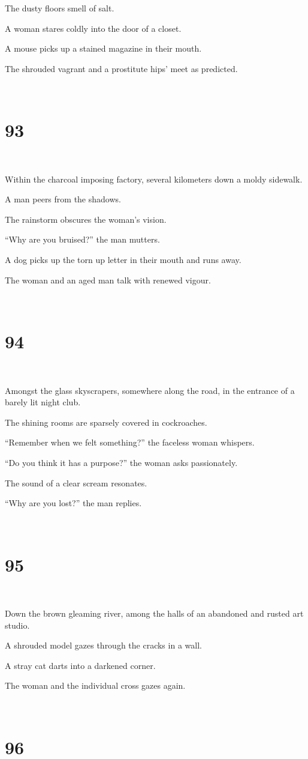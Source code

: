 \documentclass{report}
\begin{document}
The dusty floors smell of salt.

A woman stares coldly into the door of a closet.

A mouse picks up a stained magazine in their mouth.

The shrouded vagrant and a prostitute hips' meet as predicted.

~
\chapter*{93}
~

Within the charcoal imposing factory, several kilometers down a moldy sidewalk.

A man peers from the shadows.

The rainstorm obscures the woman's vision.

``Why are you bruised?'' the man mutters.

A dog picks up the torn up letter in their mouth and runs away.

The woman and an aged man talk with renewed vigour.

~
\chapter*{94}
~

Amongst the glass skyscrapers, somewhere along the road, in the entrance of a barely lit night club.

The shining rooms are sparsely covered in cockroaches.

``Remember when we felt something?'' the faceless woman whispers.

``Do you think it has a purpose?'' the woman asks passionately.

The sound of a clear scream resonates.

``Why are you lost?'' the man replies.

~
\chapter*{95}
~

Down the brown gleaming river, among the halls of an abandoned and rusted art studio.

A shrouded model gazes through the cracks in a wall.

A stray cat darts into a darkened corner.

The woman and the individual cross gazes again.

~
\chapter*{96}
~
\end{document}
